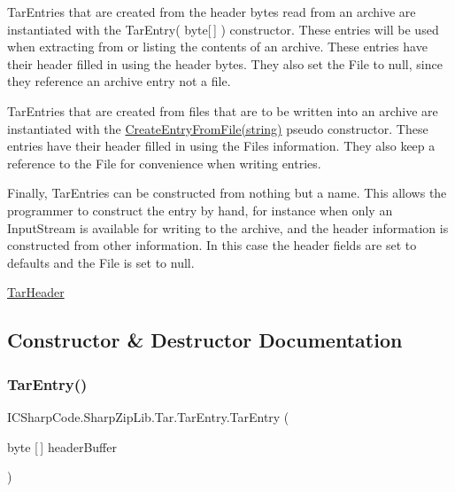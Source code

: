 Tar\+Entries that are created from the header bytes read from an archive are instantiated with the Tar\+Entry( byte\mbox{[}$\,$\mbox{]} ) constructor. These entries will be used when extracting from or listing the contents of an archive. These entries have their header filled in using the header bytes. They also set the File to null, since they reference an archive entry not a file.

Tar\+Entries that are created from files that are to be written into an archive are instantiated with the \hyperlink{class_i_c_sharp_code_1_1_sharp_zip_lib_1_1_tar_1_1_tar_entry_aad043c4b4c6060f03f8be4ff49784b2a}{Create\+Entry\+From\+File(string)} pseudo constructor. These entries have their header filled in using the File\textquotesingle{}s information. They also keep a reference to the File for convenience when writing entries.

Finally, Tar\+Entries can be constructed from nothing but a name. This allows the programmer to construct the entry by hand, for instance when only an Input\+Stream is available for writing to the archive, and the header information is constructed from other information. In this case the header fields are set to defaults and the File is set to null.

\hyperlink{class_i_c_sharp_code_1_1_sharp_zip_lib_1_1_tar_1_1_tar_header}{Tar\+Header} 

\subsection{Constructor \& Destructor Documentation}
\mbox{\label{class_i_c_sharp_code_1_1_sharp_zip_lib_1_1_tar_1_1_tar_entry_aa78f82fed0377b9b19d6d19eee461203}} 
\subsubsection{\texorpdfstring{Tar\+Entry()}{TarEntry()}\hspace{0.1cm}{\footnotesize\ttfamily [1/2]}}
{\footnotesize\ttfamily I\+C\+Sharp\+Code.\+Sharp\+Zip\+Lib.\+Tar.\+Tar\+Entry.\+Tar\+Entry (\begin{DoxyParamCaption}\item[{byte \mbox{[}$\,$\mbox{]}}]{header\+Buffer }\end{DoxyParamCaption})\hspace{0.3cm}{\ttfamily [inline]}}



